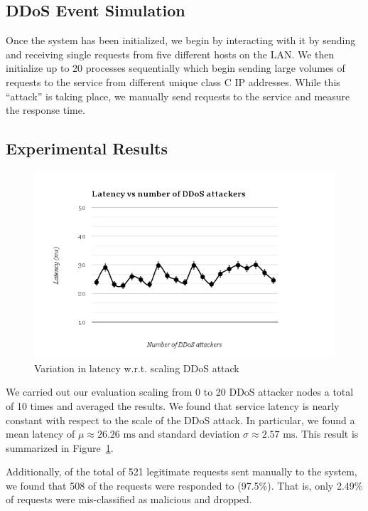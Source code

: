 \documentclass[twocolumn]{article}
\begin{document}
\subsection{DDoS Event Simulation}

Once the system has been initialized, we begin by interacting with it by sending and receiving single requests from five different hosts on the LAN. We then initialize up to 20 processes sequentially which begin sending large volumes of requests to the service from different unique class C IP addresses. While this ``attack'' is taking place, we manually send requests to the service and measure the response time.

\subsection{Experimental Results}

\begin{figure}
\begin{center}
\includegraphics[width=16cm]{latency.png}
\end{center}
\caption{Variation in latency w.r.t. scaling DDoS attack}
\label{fig:latency}
\end{figure}

We carried out our evaluation scaling from 0 to 20 DDoS attacker nodes a total of 10 times and averaged the results. We found that service latency is nearly constant with respect to the scale of the DDoS attack. In particular, we found a mean latency of $\mu\approx 26.26\mbox{~ms}$ and standard deviation $\sigma\approx 2.57\mbox{~ms}$. This result is summarized in Figure~\ref{fig:latency}.

Additionally, of the total of 521 legitimate requests sent manually to the system, we found that 508 of the requests were responded to (97.5\%). That is, only 2.49\% of requests were mis-classified as malicious and dropped.
\end{document}

